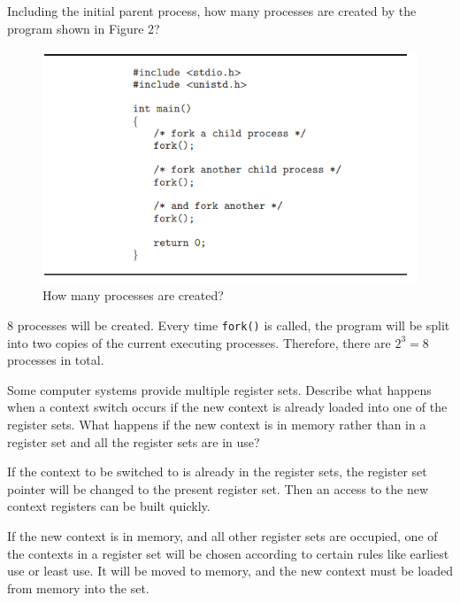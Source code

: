 \begin{exercise}[]{Including the initial parent process, how many processes are created by
    the program shown in Figure 2?
    \begin{figure}[ht]
        \centering
        \includegraphics[scale=0.6]{figure 1.png}
        \caption{ How many processes are created?}
        \end{figure} }
  \begin{solution}
    8 processes will be created. Every time \texttt{fork()} is called, the program will be split into two copies of the current executing processes. Therefore, there are $2^3=8$ processes in total.
  \end{solution}
  \label{ex2}
\end{exercise}

\begin{exercise}[]{Some computer systems provide multiple register sets. Describe what
    happens when a context switch occurs if the new context is already loaded into one of the register sets. What happens if the new context
    is in memory rather than in a register set and all the register sets are in
    use?}
  \begin{solution}
    If the context to be switched to is already in the register sets, the register set pointer will be changed to the present register set. Then an access to the new context registers can be built quickly.

    If the new context is in memory, and all other register sets are occupied, one of the contexts in a register set will be chosen according to certain rules like earliest use or least use. It will be
    moved to memory, and the new context must be loaded from memory
    into the set.
  \end{solution}
  \label{ex3}
\end{exercise}

